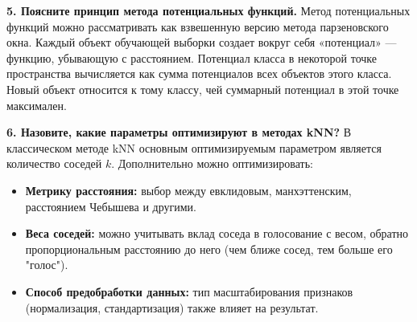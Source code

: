 \textbf{5. Поясните принцип метода потенциальных функций.}
Метод потенциальных функций можно рассматривать как взвешенную версию метода парзеновского окна. Каждый объект обучающей выборки создает вокруг себя «потенциал» — функцию, убывающую с расстоянием. Потенциал класса в некоторой точке пространства вычисляется как сумма потенциалов всех объектов этого класса. Новый объект относится к тому классу, чей суммарный потенциал в этой точке максимален.

\textbf{6. Назовите, какие параметры оптимизируют в методах kNN?}
В классическом методе kNN основным оптимизируемым параметром является количество соседей \(k\). Дополнительно можно оптимизировать:
\begin{itemize}
    \item \textbf{Метрику расстояния:} выбор между евклидовым, манхэттенским, расстоянием Чебышева и другими.
    \item \textbf{Веса соседей:} можно учитывать вклад соседа в голосование с весом, обратно пропорциональным расстоянию до него (чем ближе сосед, тем больше его "голос").
    \item \textbf{Способ предобработки данных:} тип масштабирования признаков (нормализация, стандартизация) также влияет на результат.
\end{itemize}

